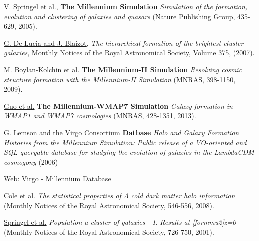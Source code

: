 \begin{thebibliography}{8}
\href{https://ui.adsabs.harvard.edu/abs/2005Natur.435..629S/abstract}{V. Springel et al.},
\textbf{The Millennium Simulation}
\textit{Simulation of the formation, evolution and clustering of galaxies and quasars}
(Nature Publishing Group, 435-629, 2005).

\href{https://ui.adsabs.harvard.edu/abs/2007MNRAS.375....2D/abstract}{G. De Lucia and J. Blaizot},
\textit{The hierarchical formation of the brightest cluster galaxies},
Monthly Notices of the Royal Astronomical Society, Volume 375, (2007).

\href{https://ui.adsabs.harvard.edu/abs/2009MNRAS.398.1150B/abstract}{M. Boylan-Kolchin et al.} 
\textbf{The Millennium-II Simulation}
\textit{Resolving cosmic structure formation with the Millennium-II Simulation}
(MNRAS, 398-1150, 2009).

\href{https://ui.adsabs.harvard.edu/abs/2013MNRAS.428.1351G/abstract}{Guo et al.} 
\textbf{The Millennium-WMAP7 Simulation}
\textit{Galaxy formation in WMAP1 and WMAP7 cosmologies}
(MNRAS, 428-1351, 2013).

\href{https://ui.adsabs.harvard.edu/abs/2006astro.ph..8019L/abstract}{G. Lemson and the Virgo Consortium} 
\textbf{Datbase}
\textit{Halo and Galaxy Formation Histories from the Millennium Simulation: Public release of a VO-oriented and SQL-queryable database for studying the evolution of galaxies in the LambdaCDM cosmogony}
(2006)

\href{http://gavo.mpa-garching.mpg.de/Millennium/}{Web: Virgo - Millennium Database}

\href{https://ui.adsabs.harvard.edu/abs/2008MNRAS.383..546C/abstract}{Cole et al.} 
\textit{The statistical properties of $\Lambda$ cold dark matter halo information}
(Monthly Notices of the Royal Astronomical Society, 546-556, 2008).

\href{https://ui.adsabs.harvard.edu/abs/2001MNRAS.328..726S/abstract}{Springel et al.} 
\textit{Population a cluster of galaxies - I. Results at [formmu2]z=0}
(Monthly Notices of the Royal Astronomical Society, 726-750, 2001).

\end{thebibliography}

